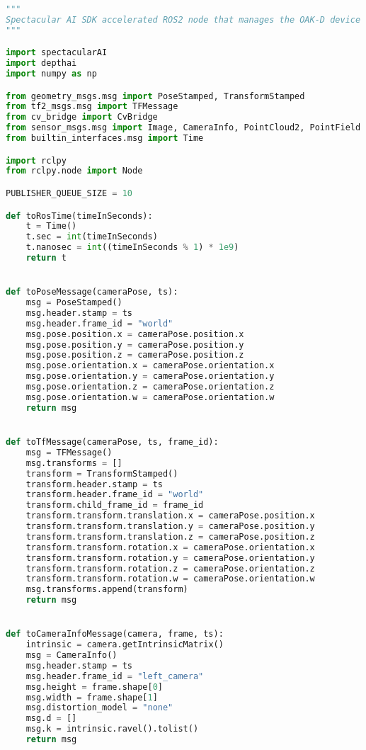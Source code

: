 \begin{lstlisting}[language=python,frame=single]
"""
Spectacular AI SDK accelerated ROS2 node that manages the OAK-D device through DepthAI Python API
"""

import spectacularAI
import depthai
import numpy as np

from geometry_msgs.msg import PoseStamped, TransformStamped
from tf2_msgs.msg import TFMessage
from cv_bridge import CvBridge
from sensor_msgs.msg import Image, CameraInfo, PointCloud2, PointField
from builtin_interfaces.msg import Time

import rclpy
from rclpy.node import Node

PUBLISHER_QUEUE_SIZE = 10

def toRosTime(timeInSeconds):
    t = Time()
    t.sec = int(timeInSeconds)
    t.nanosec = int((timeInSeconds % 1) * 1e9)
    return t


def toPoseMessage(cameraPose, ts):
    msg = PoseStamped()
    msg.header.stamp = ts
    msg.header.frame_id = "world"
    msg.pose.position.x = cameraPose.position.x
    msg.pose.position.y = cameraPose.position.y
    msg.pose.position.z = cameraPose.position.z
    msg.pose.orientation.x = cameraPose.orientation.x
    msg.pose.orientation.y = cameraPose.orientation.y
    msg.pose.orientation.z = cameraPose.orientation.z
    msg.pose.orientation.w = cameraPose.orientation.w
    return msg


def toTfMessage(cameraPose, ts, frame_id):
    msg = TFMessage()
    msg.transforms = []
    transform = TransformStamped()
    transform.header.stamp = ts
    transform.header.frame_id = "world"
    transform.child_frame_id = frame_id
    transform.transform.translation.x = cameraPose.position.x
    transform.transform.translation.y = cameraPose.position.y
    transform.transform.translation.z = cameraPose.position.z
    transform.transform.rotation.x = cameraPose.orientation.x
    transform.transform.rotation.y = cameraPose.orientation.y
    transform.transform.rotation.z = cameraPose.orientation.z
    transform.transform.rotation.w = cameraPose.orientation.w
    msg.transforms.append(transform)
    return msg


def toCameraInfoMessage(camera, frame, ts):
    intrinsic = camera.getIntrinsicMatrix()
    msg = CameraInfo()
    msg.header.stamp = ts
    msg.header.frame_id = "left_camera"
    msg.height = frame.shape[0]
    msg.width = frame.shape[1]
    msg.distortion_model = "none"
    msg.d = []
    msg.k = intrinsic.ravel().tolist()
    return msg



\end{lstlisting}

